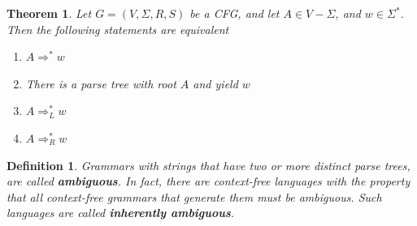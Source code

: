 \documentclass[aps,pra,onecolumn,notitlepage,superscriptaddress]{revtex4-1}
\newtheorem{theo}{Theorem}
\newtheorem{defi}{Definition}
\begin{document}
    \begin{theo}
        Let $G = (V,\Sigma,R,S)$ be a CFG, and let $A \in V - \Sigma$, and $w \in \Sigma^*$. Then the following statements are equivalent
        \begin{enumerate}
            \item $A \Rightarrow^* w$
            \item There is a parse tree with root $A$ and yield $w$
            \item $A \Rightarrow_L^* w$
            \item $A \Rightarrow_R^* w$
        \end{enumerate}
    \end{theo}

    \begin{defi}
        Grammars with strings that have two or more distinct parse trees, are called \textbf{ambiguous}. In fact, there are context-free languages with the property that all context-free grammars that generate them must be ambiguous. Such languages are called \textbf{inherently ambiguous}.
    \end{defi}
    
\end{document}
